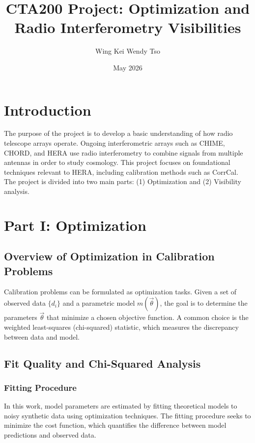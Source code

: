 \documentclass{article}
\title{CTA200 Project: Optimization and Radio Interferometry Visibilities}
\author{Wing Kei Wendy Tso}
\date{May 2026}
\begin{document}
\maketitle

\section{Introduction}

The purpose of the project is to develop a basic understanding of how radio telescope arrays operate. Ongoing interferometric arrays such as CHIME, CHORD, and HERA use radio interferometry to combine signals from multiple antennas in order to study cosmology. This project focuses on foundational techniques relevant to HERA, including calibration methods such as CorrCal. The project is divided into two main parts: (1) Optimization and (2) Visibility analysis.

\FloatBarrier

\section{Part I: Optimization}

\subsection{Overview of Optimization in Calibration Problems}

Calibration problems can be formulated as optimization tasks. Given a set of observed data $\{d_i\}$ and a parametric model $m(\vec{\theta})$, the goal is to determine the parameters $\vec{\theta}$ that minimize a chosen objective function. A common choice is the weighted least-squares (chi-squared) statistic, which measures the discrepancy between data and model.

\subsection{Fit Quality and Chi-Squared Analysis}

\subsubsection{Fitting Procedure}

In this work, model parameters are estimated by fitting theoretical models to noisy synthetic data using optimization techniques. The fitting procedure seeks to minimize the cost function, which quantifies the difference between model predictions and observed data.
\end{document}
